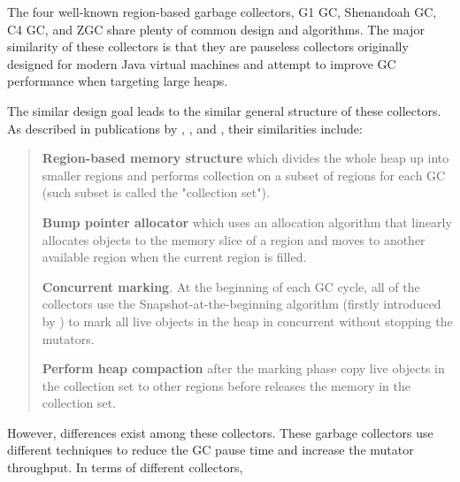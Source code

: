 The four well-known region-based garbage collectors, G1 GC, Shenandoah GC, C4 GC, and
ZGC share plenty of common design and algorithms. The major similarity of these collectors
is that they are pauseless collectors originally designed for modern Java virtual
machines and attempt to improve GC performance when targeting large heaps.

The similar design goal leads to the similar general structure of these collectors.
As described in publications by \cite{detlefs2004garbage}, \cite{flood2016shenandoah},
\cite{tene2011c4} and \cite{liden_karlsson_2018}, their similarities include:

\begin{quote}
  \textbf{Region-based memory structure}
    which divides the whole heap up into smaller regions and performs collection
    on a subset of regions for each GC (such subset is called the "collection set").

  \textbf{Bump pointer allocator}
    which uses an allocation algorithm that linearly allocates objects to the memory
    slice of a region and moves to another available region when the current region is filled.

  \textbf{Concurrent marking}.
    At the beginning of each GC cycle, all of the collectors use the Snapshot-at-the-beginning algorithm
    (firstly introduced by \cite{yuasa1990real}) to mark all live objects in the heap
    in concurrent without stopping the mutators.

  \textbf{Perform heap compaction}
    after the marking phase copy live objects in the collection set to other
    regions before releases the memory in the collection set.
\end{quote}

However, differences exist among these collectors. These garbage collectors use
different techniques to reduce the GC pause time and increase the mutator throughput.
In terms of different collectors,

